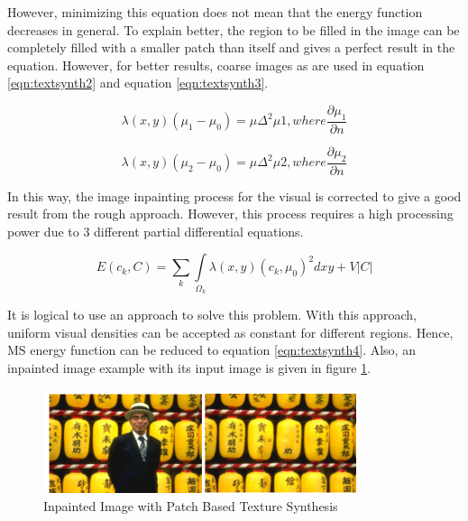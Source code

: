 However, minimizing this equation does not mean that the energy function decreases in general. To explain better, the region to be filled in the image can be completely filled with a smaller patch than itself and gives a perfect result in the equation. However, for better results, coarse images as  are used in equation \ref{eqn:textsynth2} and equation \ref{eqn:textsynth3}.

\begin{equation}
    \label{eqn:textsynth2}
    \lambda(x,y)(\mu_1-\mu_0)=\mu\Delta^2\mu1, where \frac{\partial\mu_1}{\partial n}
\end{equation}

\begin{equation}
    \label{eqn:textsynth3}
    \lambda(x,y)(\mu_2-\mu_0)=\mu\Delta^2\mu2, where \frac{\partial\mu_2}{\partial n}
\end{equation}

In this way, the image inpainting process for the visual is corrected to give a good result from the rough approach. However, this process requires a high processing power due to 3 different partial differential equations.

\begin{equation}
    \label{eqn:textsynth4}
    E(c_k, C) = \sum\limits_{k}\int\limits_{\Omega_k}\lambda(x,y){(c_k,\mu_0)}^2dxy+V|C|
\end{equation}

It is logical to use an approach to solve this problem. With this approach, uniform visual densities can be accepted as constant for different regions. Hence, MS energy function can be reduced to equation \ref{eqn:textsynth4}. Also, an inpainted image example with its input image is given in figure \ref{fig:patch-based-example}.

\begin{figure}[h]
    \centering
    \includegraphics{figures/chapter2/Patch-Based-texture-synth-example.png}
    \vspace*{5mm}
    \caption{Inpainted Image with Patch Based Texture Synthesis\cite{patch_based_tex_synthesis}}
    \label{fig:patch-based-example}
\end{figure}

